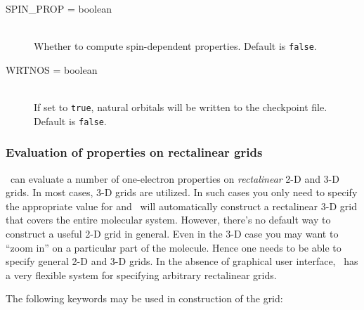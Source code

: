 \begin{description}
\item[SPIN\_PROP = boolean]\mbox{}\\
Whether to compute spin-dependent properties.
Default is {\tt false}.

\item[WRTNOS = boolean]\mbox{}\\
If set to {\tt true},
natural orbitals will be written to the checkpoint file.
Default is {\tt false}.

\end{description}


\subsubsection{Evaluation of properties on rectalinear grids}
\PSIthree\ can evaluate a number of one-electron properties
on {\em rectalinear} 2-D and 3-D grids. In most cases,
3-D grids are utilized. In such cases you only need
to specify the appropriate value for 
and \PSIthree\ will automatically construct a rectalinear
3-D grid that covers the entire molecular system.
However, there's no default way to construct a useful 2-D
grid in general. Even in the 3-D case you may want to
``zoom in'' on a particular part of the molecule.
Hence one needs to be able to specify general 2-D
and 3-D grids. In the absence of graphical user interface,
\PSIthree\ has a very flexible system for specifying
arbitrary rectalinear grids.

The following keywords may be used in construction of
the grid:

